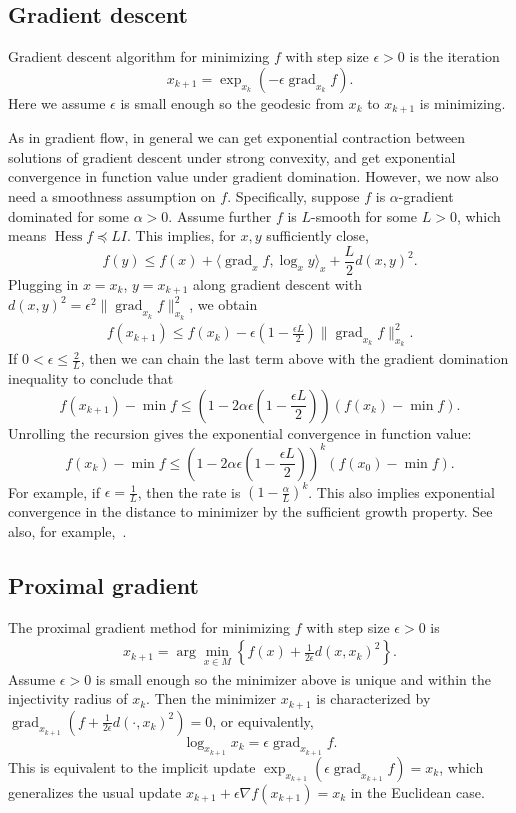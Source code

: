 \documentclass[final,12pt]{colt2018}
\DeclareMathOperator{\grad}{grad}
\DeclareMathOperator{\Hess}{Hess}
\begin{document}
\subsection{Gradient descent}

Gradient descent algorithm for minimizing $f$ with step size $\epsilon > 0$ is the iteration
$$x_{k+1} = \exp_{x_k}(-\epsilon \grad_{x_k} f).$$
Here we assume $\epsilon$ is small enough so the geodesic from $x_k$ to $x_{k+1}$ is minimizing.

As in gradient flow, in general we can get exponential contraction between solutions of gradient descent under strong convexity, and get exponential convergence in function value under gradient domination.
However, we now also need a smoothness assumption on $f$.
%
Specifically, suppose $f$ is $\alpha$-gradient dominated for some $\alpha > 0$.
Assume further $f$ is $L$-smooth for some $L > 0$, which means $\Hess f \preceq LI$.
This implies, for $x,y$ sufficiently close,
$$f(y) \le f(x) + \langle \grad_x f, \log_x y \rangle_x + \frac{L}{2} d(x,y)^2.$$
Plugging in $x = x_k$, $y = x_{k+1}$ along gradient descent with $d(x,y)^2 = \epsilon^2 \|\grad_{x_k} f\|_{x_k}^2$, we obtain
\begin{align}\label{Eq:GDEq}
f(x_{k+1}) \le f(x_k) - \epsilon \left(1-\frac{\epsilon L}{2}\right) \|\grad_{x_k} f\|^2_{x_k}.
\end{align}
If $0 < \epsilon \le \frac{2}{L}$, then we can chain the last term above with the gradient domination inequality to conclude that
$$f(x_{k+1}) - \min f \le \left(1-2\alpha \epsilon \left(1-\frac{\epsilon L}{2}\right) \right) (f(x_k)-\min f).$$
Unrolling the recursion gives the exponential convergence in function value:
$$f(x_k)-\min f \le \left(1-2\alpha \epsilon \left(1-\frac{\epsilon L}{2}\right) \right)^k (f(x_0)-\min f).$$
For example, if $\epsilon = \frac{1}{L}$, then the rate is $(1-\frac{\alpha}{L})^k$.
This also implies exponential convergence in the distance to minimizer by the sufficient growth property.
See also, for example,~\cite[]{FO98,ZS16,KNS16}.


\subsection{Proximal gradient}

The proximal gradient method for minimizing $f$ with step size $\epsilon > 0$ is
\begin{align}\label{Eq:PGGen}
x_{k+1} = \arg\min_{x \in M} \left\{ f(x) + \frac{1}{2\epsilon} d(x,x_k)^2 \right\}.
\end{align}
Assume $\epsilon > 0$ is small enough so the minimizer above is unique and within the injectivity radius of $x_k$.
Then the minimizer $x_{k+1}$ is characterized by $\grad_{x_{k+1}} (f + \frac{1}{2\epsilon} d(\cdot, x_k)^2) = 0$, or equivalently,
$$\log_{x_{k+1}} x_k = \epsilon \grad_{x_{k+1}} f.$$
This is equivalent to the implicit update $\exp_{x_{k+1}}(\epsilon \grad_{x_{k+1}} f) = x_k$, which generalizes the usual update $x_{k+1} + \epsilon \nabla f(x_{k+1}) = x_k$ in the Euclidean case.
\end{document}
